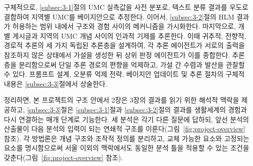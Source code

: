 구체적으로, \ref{subsec:3-1}절의 UMC 실측값을 사전 분포로, 텍스트 분류 결과를 우도로 결합하여 지역별 UMC를 베이지안으로 추정한다. 이어서, \ref{subsec:3-2}절의 HLM 결과가 허용하는 범위 내에서 구조와 경험 사이의 메커니즘을 가시화한다. 마지막으로, 개별 게시글과 지역의 UMC 개념 사이의 인과적 기제를 추론한다. 이때 귀추적, 전향적, 경로적 추론의 세 가지 독립된 추론층을 설계하여, 각 추론 에이전트가 서로의 출력을 참조하지 않은 상태에서 가설을 생성한 뒤 상위 판정 에이전트가 이를 종합한다. 추론층을 분리함으로써 단일 추론 경로의 편향을 억제하고, 가설 간 수렴과 발산을 관찰할 수 있다. 프롬프트 설계, 오분류 억제 전략, 베이지안 업데이트 및 추론 절차의 구체적 내용은 \ref{subsec:3-3}절에서 상술한다.

정리하면, 본 프로젝트의 구조 안에서 2장은 3장의 결과를 읽기 위한 해석적 맥락을 제공하고, \ref{subsec:3-3}절은 \ref{subsec:3-1}절과 \ref{subsec:3-2}절의 결과를 생활세계의 경험과 다시 연결하는 매개 단계로 기능한다. 세 분석은 각기 다른 질문에 답하되, 앞선 분석의 산출물이 다음 분석의 입력이 되는 연쇄적 구조를 이룬다(그림~\ref{fig:project-overview} 참조). 각 방법론은 개념 구조와 조작적 정의를 분리하고, 교체 가능한 요소와 고정되는 요소를 명시함으로써 서울 이외의 맥락에서도 동일한 분석 틀을 적용할 수 있는 조건을 갖춘다(그림~\ref{fig:project-overview} 참조).

